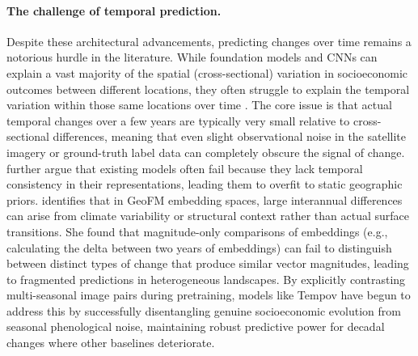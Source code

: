 \documentclass[12pt,letterpaper]{article}
\begin{document}
\paragraph{The challenge of temporal prediction.} Despite these architectural advancements, predicting changes over time remains a notorious hurdle in the literature. While foundation models and CNNs can explain a vast majority of the spatial (cross-sectional) variation in socioeconomic outcomes between different locations, they often struggle to explain the temporal variation within those same locations over time \parencite{khachiyan2021using, zheng2025dynamic}. The core issue is that actual temporal changes over a few years are typically very small relative to cross-sectional differences, meaning that even slight observational noise in the satellite imagery or ground-truth label data can completely obscure the signal of change. \textcite{zheng2026satellite} further argue that existing models often fail because they lack temporal consistency in their representations, leading them to overfit to static geographic priors. \textcite{Burns2026} identifies that in GeoFM embedding spaces, large interannual differences can arise from climate variability or structural context rather than actual surface transitions. She found that magnitude-only comparisons of embeddings (e.g., calculating the delta between two years of embeddings) can fail to distinguish between distinct types of change that produce similar vector magnitudes, leading to fragmented predictions in heterogeneous landscapes. By explicitly contrasting multi-seasonal image pairs during pretraining, models like Tempov have begun to address this by successfully disentangling genuine socioeconomic evolution from seasonal phenological noise, maintaining robust predictive power for decadal changes where other baselines deteriorate.
\end{document}

